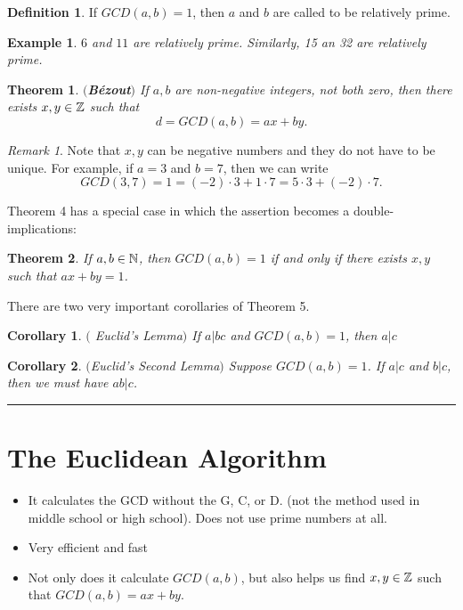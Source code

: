 \documentclass[12pt]{article}
\theoremstyle{plain}
\newtheorem{corollary}{Corollary}
\newtheorem{example}{Example}
\newtheorem{theorem}{Theorem}
\theoremstyle{definition}
\newtheorem{definition}{Definition}
\theoremstyle{remark}
\newtheorem{remark}{Remark}
\begin{document}
\begin{definition}
If $GCD(a,b)=1$, then $a$ and $b$ are called to be relatively prime.
\end{definition}

\begin{example}
$6$ and $11$ are relatively prime. Similarly, 15 an 32 are relatively prime. 
\end{example}

\begin{theorem} {\bf $($B\'ezout$)$}
If $a, b$ are non-negative integers, not both zero, then there exists $x, y \in \mathbb{Z}$ such that 
$$d=GCD(a,b) = ax+by.$$
\end{theorem}

\bigskip
\begin{remark}
Note that $x, y$ can be negative numbers and they do not have to be unique. For example, if $a=3$ and $b=7$, then we can write 
$$GCD(3,7) = 1 = (-2)\cdot 3+1\cdot 7 = 5\cdot 3+(-2)\cdot 7.$$
\end{remark}

\bigskip
\noindent
Theorem 4 has a special case in which the assertion becomes a double-implications:

\begin{theorem}
If $a, b\in \mathbb{N}$, then $GCD(a,b) = 1$ if and only if there exists $x, y$ such that $ax+by = 1$. 
\end{theorem}

There are two very important corollaries of Theorem 5. 

\begin{corollary} $($ Euclid's Lemma$)$
If $a|bc$ and $GCD(a,b)=1$, then $a|c$
\end{corollary}

\begin{corollary} $($Euclid's Second Lemma$)$
Suppose $GCD(a,b)=1$. If $a|c$ and $b|c$, then we must have $ab|c$.
\end{corollary}

\bigskip
\hrule

\section{The Euclidean Algorithm}
\begin{itemize}
    \item It calculates the GCD without the G, C, or D. (not the method used in middle school or high school). Does not use prime numbers at all.
    \item Very efficient and fast
    \item Not only does it calculate $GCD(a,b)$, but also helps us find $x, y\in \mathbb{Z}$ such that $GCD(a,b)=ax+by$. 
\end{itemize}
\end{document}
